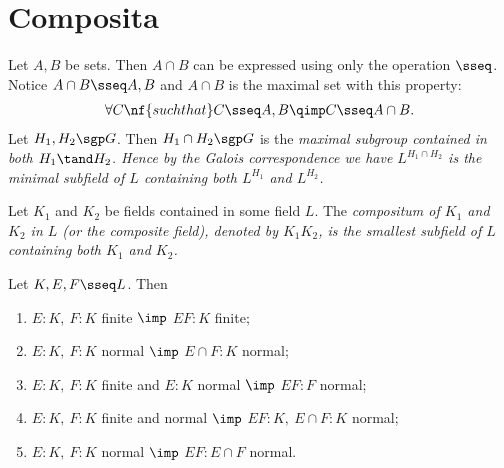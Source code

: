 \documentclass[a4paper]{article}
\begin{document}
\section{Composita}
\begin{tremark}
  Let \( A,B \) be sets. Then \( A\cap B \) can be expressed using only the operation \( \sseq \).
  Notice \( A\cap B \sseq A,B \) and \( A\cap B \) is the maximal set with this property: \begin{align*}
    \forall C \nf{ such that } C\sseq A,B \qimp C\sseq A\cap B.
  \end{align*}
  Let \( H_1,H_2\sgp G \).
  Then \( H_1\cap H_2 \sgp G \) is the \it{maximal} subgroup contained in both \( H_1 \tand H_2 \).
  Hence by the Galois correspondence we have \( L^{H_1\cap H_2} \) is the \it{minimal} subfield of \( L \) containing both \( L^{H_1} \) and \( L^{H_2} \).
\end{tremark}

\begin{tdefinition}[Compositum]
  Let \( K_1 \) and \( K_2 \) be fields contained in some field \( L \).
  The \it{compositum} of \( K_1 \) and \( K_2 \) in \( L \) (or the \it{composite field}), denoted by \( K_1K_2 \), is the smallest subfield of \( L \) containing both \( K_1 \) and \( K_2 \).
\end{tdefinition}

\begin{tlemma}
  Let \( K,E,F \sseq L \).
  Then \begin{enumerate}
    \item \( E:K,\ F:K \) finite \( \imp \) \( EF:K \) finite;
    \item \( E:K,\ F:K \) normal \( \imp \) \( E\cap F:K \) normal;
    \item \( E:K,\ F:K \) finite and \( E:K \) normal \( \imp \) \( EF:F \) normal;
    \item \( E:K,\ F:K \) finite and normal \( \imp \) \( EF:K,\ E\cap F:K \) normal;
    \item \( E:K,\ F:K \) normal \( \imp \) \( EF:E\cap F \) normal.
  \end{enumerate}
\end{tlemma}
\end{document}

